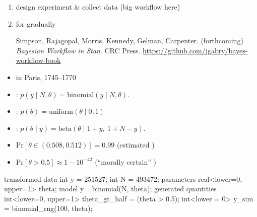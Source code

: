 \documentclass[10pt]{report}
\begin{document}

\begin{enumerate}
\item design experiment \& collect data (big workflow here)
\item for gradually 
\vfill
{\footnotesize Simpson, Rajagopal, Morris, Kennedy, Gelman, Carpenter.  (forthcoming) {\it Bayesian Workflow in Stan}. CRC Press. \url{https://github.com/jgabry/bayes-workflow-book}}
\end{enumerate}


\begin{itemize}
\item {} in Paris, 1745--1770
\item {}:
$p(y \mid N, \theta)
 = \textrm{binomial}(y \mid N, \theta).$
\item {}:
$p(\theta)
 = \textrm{uniform}(\theta \mid 0, 1)$
\item {}:
$p(\theta \mid y)
 = \textrm{beta}(\theta \mid 1 + y, \ 1 + N - y).$
\vfill
\item {$\textrm{Pr}[\theta \in (0.508, 0.512)] = 0.99$}
\hfill {\small (estimated )}
\item {$\textrm{Pr}[\theta > 0.5] \approx 1 - 10^{-42}$}
\hfill {\small (``morally certain'' )}
\end{itemize}

\begin{stancode}
transformed data {
  int y = 251527;  int N = 493472;
}
parameters {
  real<lower=0, upper=1> theta;
}
model {
  y ~ binomial(N, theta);
}
generated quantities {
  int<lower=0, upper=1> theta_gt_half = (theta > 0.5);
  int<lower = 0> y_sim = binomial_rng(100, theta);
}
\end{stancode}
\end{document}

